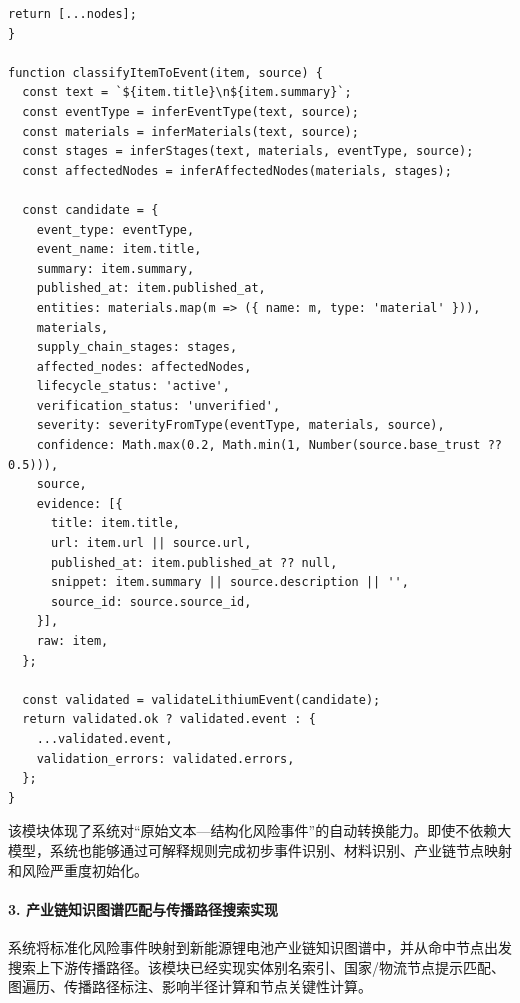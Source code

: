\documentclass[12pt,a4paper]{article}
\begin{document}
\begin{lstlisting}[style=projectcode,caption={多源新闻条目到风险事件的抽取与映射}]
  return [...nodes];
}

function classifyItemToEvent(item, source) {
  const text = `${item.title}\n${item.summary}`;
  const eventType = inferEventType(text, source);
  const materials = inferMaterials(text, source);
  const stages = inferStages(text, materials, eventType, source);
  const affectedNodes = inferAffectedNodes(materials, stages);

  const candidate = {
    event_type: eventType,
    event_name: item.title,
    summary: item.summary,
    published_at: item.published_at,
    entities: materials.map(m => ({ name: m, type: 'material' })),
    materials,
    supply_chain_stages: stages,
    affected_nodes: affectedNodes,
    lifecycle_status: 'active',
    verification_status: 'unverified',
    severity: severityFromType(eventType, materials, source),
    confidence: Math.max(0.2, Math.min(1, Number(source.base_trust ?? 0.5))),
    source,
    evidence: [{
      title: item.title,
      url: item.url || source.url,
      published_at: item.published_at ?? null,
      snippet: item.summary || source.description || '',
      source_id: source.source_id,
    }],
    raw: item,
  };

  const validated = validateLithiumEvent(candidate);
  return validated.ok ? validated.event : {
    ...validated.event,
    validation_errors: validated.errors,
  };
}
\end{lstlisting}

该模块体现了系统对“原始文本—结构化风险事件”的自动转换能力。即使不依赖大模型，系统也能够通过可解释规则完成初步事件识别、材料识别、产业链节点映射和风险严重度初始化。

\paragraph{3. 产业链知识图谱匹配与传播路径搜索实现}

系统将标准化风险事件映射到新能源锂电池产业链知识图谱中，并从命中节点出发搜索上下游传播路径。该模块已经实现实体别名索引、国家/物流节点提示匹配、图遍历、传播路径标注、影响半径计算和节点关键性计算。
\end{document}
